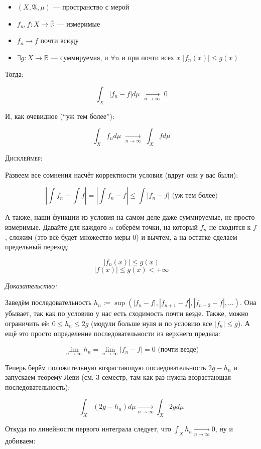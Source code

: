 \documentclass{article}
\def\dbl{\,\,}
\def\rinf{\overline{\mathbb{R}}}
\def\goesto#1{\underset{#1}{\longrightarrow}}
\def\toinf#1{\goesto{#1 \rightarrow \infty}}
\def\ntoinf{\toinf{n}}
\begin{document}
\begin{itemize}
    \item $(X, \mathfrak{A}, \mu)$ --- пространство с мерой
    \item $f_n, f: X \rightarrow \rinf$ --- измеримые
    \item $f_n \rightarrow f$ почти всюду
    \item $\exists g: X \rightarrow \rinf$ --- суммируемая, и $\forall n$ и при почти всех $x \dbl |f_n(x)| \le g(x)$
\end{itemize}

Тогда:

\[\int_{X}|f_n - f| d \mu \dbl \ntoinf \dbl 0\]

И, как очевидное (``уж тем более''):

\[\int_{X} f_n d\mu \dbl \ntoinf \dbl \int_{X} f d\mu\]


\textsc{Дисклеймер:}

Развеем все сомнения насчёт корректности условия (вдруг они у вас были):

\[\left| \int f_n - \int f \right| = \left| \int f_n - f \right| \le \int |f_n - f| \text{ (уж тем более)}\]

А также, наши функции из условия на самом деле даже суммируемые, не просто измеримые. Давайте для каждого $n$ соберём точки, на который $f_n$ не сходится к $f$, сложим (это всё будет множество меры 0) и вычтем, а на остатке сделаем предельный переход:

\[|f_n(x)| \le g(x)\]
\[|f(x)| \le g(x) < +\infty\]

\textit{Доказательство:}

Заведём последовательность $h_n := \sup (|f_n - f|, |f_{n + 1} - f|, |f_{n + 2} - f|, \ldots)$. Она убывает, так как по условию у нас есть сходимость почти везде. Также, можно ограничить её: $0 \le h_n \le 2 g$ (модули больше нуля и по условию все $|f_n| \le g$). А ещё это просто определение последовательности из верхнего предела:

\[\lim_{n \rightarrow \infty} h_n = \overline{\lim_{n \rightarrow \infty}} |f_n - f| = 0 \text{ (почти везде)}\]

Теперь берём положительную возрастающую последовательность $2g - h_n$ и запускаем теорему Леви (см. 3 семестр, там как раз нужна возрастающая последовательность):

\[\int_{X} (2g - h_n) d\mu \ntoinf \int_{X} 2g d\mu\]

Откуда по линейности первого интеграла следует, что $\int_{X} h_n \ntoinf 0$, ну и добиваем:
\end{document}
